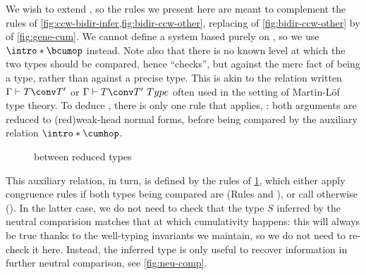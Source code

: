 We wish to extend , so the rules we present here are meant to complement
the rules of \cref{fig:ccw-bidir-infer,fig:bidir-ccw-other}, replacing 
of \cref{fig:bidir-ccw-other} by  of \cref{fig:gene-cum}.
We cannot define a system based purely on ,%
so we use  $\intro* \bcumop$ instead.
Note also that there is no known level at which the two types should be compared,
hence  “checks”, but against the mere
fact of being a type, rather than against a precise type. This is akin to the relation
written $\Gamma \vdash T \conv T'$ or $\Gamma \vdash T \conv T'\ Type$ often used in the
setting of Martin-Löf type theory.
To deduce ,
there is only one rule that applies, :
both arguments are reduced to \kl(red){weak-head} normal forms, before being compared
by the auxiliary relation $\intro* \cumhop$.

\begin{figure}[h]
  \ContinuedFloat
  \caption{ between reduced types}
  \label{fig:gene-cumh}
\end{figure}

This auxiliary relation, in turn, is defined by the rules of \cref{fig:gene-cumh}, which
either apply congruence rules if both types being compared are 
(Rules  and ), or call
 otherwise (). In the latter case,
we do not need to check that the type $S$ inferred by the neutral comparision matches that
at which cumulativity happens: this will always be true thanks to the well-typing invariants
we maintain, so we do not need to re-check it here. Instead, the inferred type is only
useful to recover information in further neutral comparison, see \cref{fig:neu-comp}.

